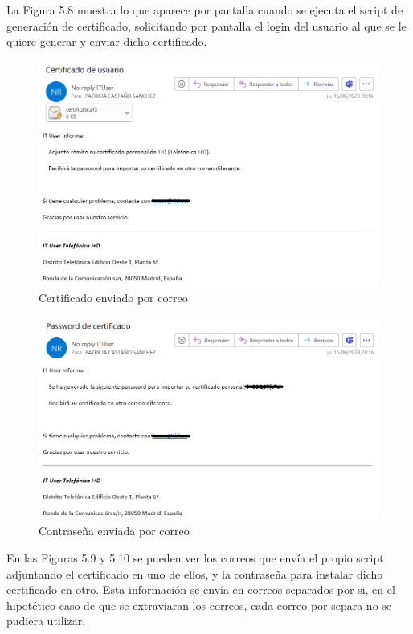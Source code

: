 \documentclass[a4paper, 12pt]{book}
\begin{document}
\begin{itemize}
La Figura 5.8 muestra lo que aparece por pantalla cuando se ejecuta el script de generación de certificado, solicitando por pantalla el login del usuario al que se le quiere generar y enviar dicho certificado.

\begin{figure}
	\centering
	\includegraphics[width=17cm, keepaspectratio]{img/image09.png}
	\caption{Certificado enviado por correo}
	\label{fig:image09}
\end{figure}

\begin{figure}
	\centering
	\includegraphics[width=17cm, keepaspectratio]{img/image10.png}
	\caption{Contraseña enviada por correo}
	\label{fig:image10}
\end{figure}

En las Figuras 5.9 y 5.10 se pueden ver los correos que envía el propio script adjuntando el certificado en uno de ellos, y la contraseña para instalar dicho certificado en otro. Esta información se envía en correos separados por si, en el hipotético caso de que se extraviaran los correos, cada correo por separa no se pudiera utilizar.


\end{itemize}
\end{document}
